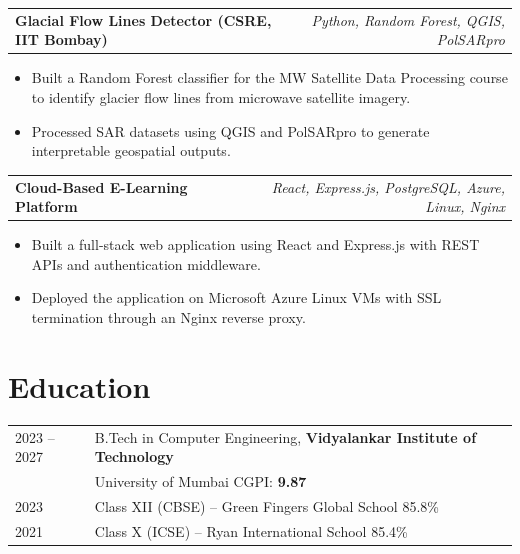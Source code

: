 \documentclass[a4paper,10pt]{article}
\begin{document}
\begin{tabularx}{\linewidth}{ @{}l r@{} }
\textbf{Glacial Flow Lines Detector (CSRE, IIT Bombay)} & \hfill \scriptsize{\textit{Python, Random Forest, QGIS, PolSARpro}} \\[2pt]
\end{tabularx}
\begin{minipage}[t]{\linewidth}
\begin{itemize}[nosep,after=\strut, leftmargin=2.3em, itemsep=1.8pt,label=\textbullet]
\item Built a Random Forest classifier for the MW Satellite Data Processing course to identify glacier flow lines from microwave satellite imagery.
\item Processed SAR datasets using QGIS and PolSARpro to generate interpretable geospatial outputs.
\end{itemize}
\end{minipage}
\vspace{2pt}

\begin{tabularx}{\linewidth}{ @{}l r@{} }
\textbf{Cloud-Based E-Learning Platform} & \hfill \scriptsize{\textit{React, Express.js, PostgreSQL, Azure, Linux, Nginx}} \\[2pt]
\end{tabularx}
\begin{minipage}[t]{\linewidth}
\begin{itemize}[nosep,after=\strut, leftmargin=2.3em, itemsep=1.8pt,label=\textbullet]
\item Built a full-stack web application using React and Express.js with REST APIs and authentication middleware.
\item Deployed the application on Microsoft Azure Linux VMs with SSL termination through an Nginx reverse proxy.
\end{itemize}
\end{minipage}

\section{Education}
\begin{tabularx}{\linewidth}{@{}l X@{}}	
2023 -- 2027 & B.Tech in Computer Engineering, \textbf{Vidyalankar Institute of Technology} \\
             & University of Mumbai \hfill CGPI: \textbf{9.87} \\
2023 & Class XII (CBSE) -- Green Fingers Global School \hfill 85.8\% \\
2021 & Class X (ICSE) -- Ryan International School \hfill 85.4\% \\
\end{tabularx}
\end{document}

